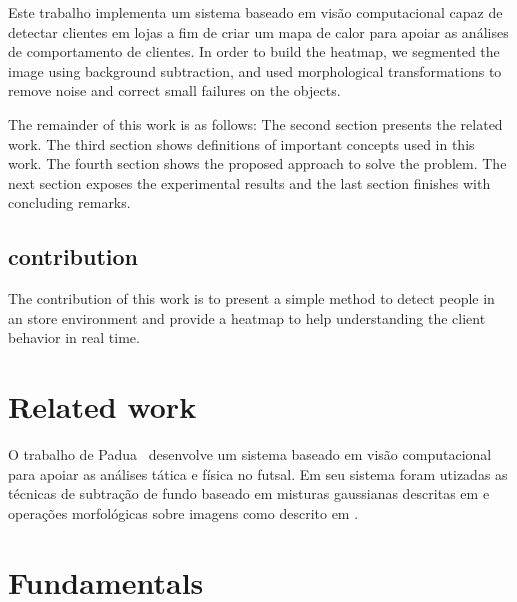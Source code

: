 \documentclass[10pt, conference]{IEEEtran}
\begin{document}
Este trabalho implementa um sistema baseado em visão computacional capaz de detectar clientes em lojas a fim de criar um mapa de calor para apoiar as análises de comportamento de clientes. In order to build the heatmap, we segmented the image using background subtraction, and used morphological transformations to remove noise and correct small failures on the objects.

The remainder of this work is as follows: The second section presents the related work. The third section shows definitions of important concepts used in this work. The fourth section shows the proposed approach to solve the problem. The next section exposes the experimental results and the last section finishes with concluding remarks.

\subsection{contribution}
The contribution of this work is to present a simple method to detect people in an store environment and provide a heatmap to help understanding the client behavior in real time.

\section{Related work}
O trabalho de Padua~\cite{padua2014sistema} desenvolve um sistema baseado em visão computacional para apoiar as análises tática e física no futsal. Em seu sistema foram utizadas as técnicas de subtração de fundo baseado em misturas gaussianas descritas em \cite{zivkovic2004improved} e operações morfológicas sobre imagens como descrito em \cite{haralick1987image}.

\section{Fundamentals}
\end{document}
